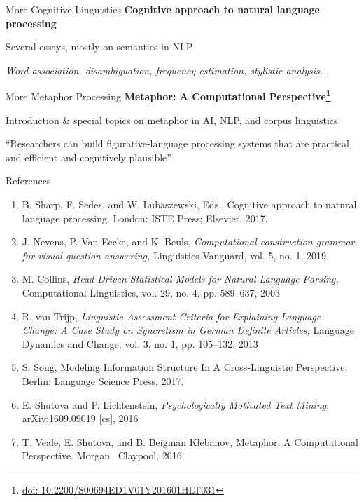 \documentclass[aspectratio=169,cramped]{beamer}
\let\tempone\itemize
\let\temptwo\enditemize
\renewenvironment{itemize}{\tempone\addtolength{\itemsep}{-0\baselineskip}\addtolength{\parskip}{-0.2\baselineskip}}{\temptwo}
\newcommand*{\doi}[1]{\href{http://doai.io/#1}{doi: #1}}
\begin{document}
\begin{frame}{More Cognitive Linguistics}
	\textbf{Cognitive approach to natural language processing}
  \begin{itemize}
  \item Several essays, mostly on semantics in NLP
  \item \textit{Word association, disambiguation, frequency estimation, stylistic analysis\ldots}
  \end{itemize}
\end{frame}

\begin{frame}{More Metaphor Processing}
	\textbf{Metaphor: A Computational Perspective\footnote{\doi{10.2200/S00694ED1V01Y201601HLT031}}}
  \begin{itemize}
  \item Introduction \& special topics on metaphor in AI, NLP, and corpus linguistics
  \item ``Researchers can build figurative-language processing systems that are practical
    and efficient and cognitively plausible''
  \end{itemize}
\end{frame}


\begin{frame}{References}
  \vspace{-0.5cm}
  \begin{enumerate}
  \scriptsize
  \item B. Sharp, F. Sedes, and W. Lubaszewski, Eds., Cognitive approach to natural language processing. London: ISTE Press; Elsevier, 2017.
  \item J. Nevens, P. Van Eecke, and K. Beuls, \textit{Computational construction grammar for visual question answering,} Linguistics Vanguard, vol. 5, no. 1, 2019
  \item M. Collins, \textit{Head-Driven Statistical Models for Natural Language Parsing,} Computational Linguistics, vol. 29, no. 4, pp. 589--637, 2003
  \item R. van Trijp, \textit{Linguistic Assessment Criteria for Explaining Language Change: A Case Study on Syncretism in German Definite Articles,} Language Dynamics and Change, vol. 3, no. 1, pp. 105–132, 2013
  \item S. Song, Modeling Information Structure In A Cross-Linguistic Perspective. Berlin: Language Science Press, 2017.
  \item E. Shutova and P. Lichtenstein, \textit{Psychologically Motivated Text Mining},
    arXiv:1609.09019 [cs], 2016
  \item T. Veale, E. Shutova, and B. Beigman Klebanov, Metaphor: A Computational Perspective. Morgan \ Claypool, 2016.
  \end{enumerate}
\end{frame}
\end{document}
